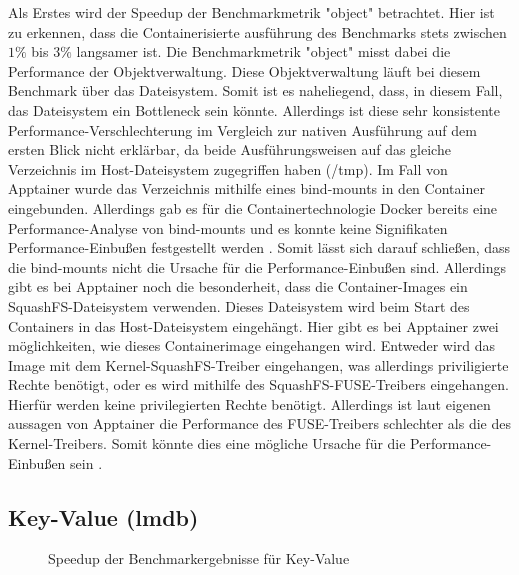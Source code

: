 Als Erstes wird der Speedup der Benchmarkmetrik "object" betrachtet. Hier ist zu erkennen, dass die Containerisierte ausführung des Benchmarks stets zwischen $1\%$ bis $3\%$ langsamer ist. Die Benchmarkmetrik "object" misst dabei die Performance der Objektverwaltung. Diese Objektverwaltung läuft bei diesem Benchmark über das Dateisystem. Somit ist es naheliegend, dass, in diesem Fall, das Dateisystem ein Bottleneck sein könnte. Allerdings ist diese sehr konsistente Performance-Verschlechterung im Vergleich zur nativen Ausführung auf dem ersten Blick nicht erklärbar, da beide Ausführungsweisen auf das gleiche Verzeichnis im Host-Dateisystem zugegriffen haben (/tmp). Im Fall von Apptainer wurde das Verzeichnis mithilfe eines bind-mounts in den Container eingebunden. Allerdings gab es für die Containertechnologie Docker bereits eine Performance-Analyse von bind-mounts und es konnte keine Signifikaten Performance-Einbußen festgestellt werden \cite[Vgl. 4]{dordevicFileSystemPerformance2022}. Somit lässt sich darauf schließen, dass die bind-mounts nicht die Ursache für die Performance-Einbußen sind. Allerdings gibt es bei Apptainer noch die besonderheit, dass die Container-Images ein SquashFS-Dateisystem verwenden. Dieses Dateisystem wird beim Start des Containers in das Host-Dateisystem eingehängt. Hier gibt es bei Apptainer zwei möglichkeiten, wie dieses Containerimage eingehangen wird. Entweder wird das Image mit dem Kernel-SquashFS-Treiber eingehangen, was allerdings priviligierte Rechte benötigt, oder es wird mithilfe des SquashFS-FUSE-Treibers eingehangen. Hierfür werden keine privilegierten Rechte benötigt. Allerdings ist laut eigenen aussagen von Apptainer die Performance des FUSE-Treibers schlechter als die des Kernel-Treibers. Somit könnte dies eine mögliche Ursache für die Performance-Einbußen sein \cite{apptainerSecurityApptainerApptainer}.  

\subsection{Key-Value (lmdb)}


\begin{figure}
    \centering
    
    \caption{Speedup der Benchmarkergebnisse für Key-Value}
    \label{fig:speedup_kv}
\end{figure}

\FloatBarrier


